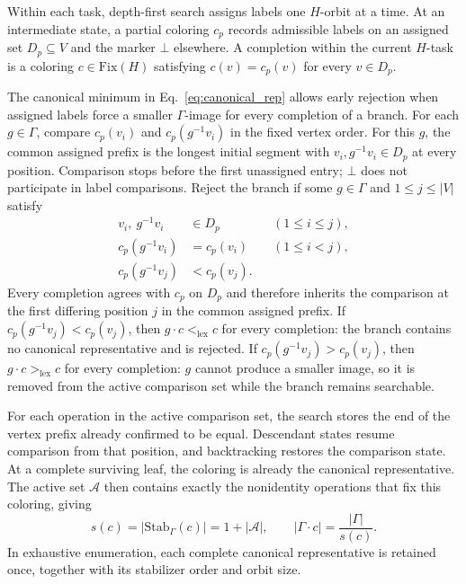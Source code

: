 \documentclass[a5paper, 10pt]{article}
\begin{document}
Within each task, depth-first search assigns labels one $H$-orbit at a time. At an intermediate state, a partial coloring $c_p$ records admissible labels on an assigned set $D_p\subseteq V$ and the marker $\bot$ elsewhere. A completion within the current $H$-task is a coloring $c\in\mathrm{Fix}(H)$ satisfying $c(v)=c_p(v)$ for every $v\in D_p$.

The canonical minimum in Eq.~\ref{eq:canonical_rep} allows early rejection when assigned labels force a smaller $\Gamma$-image for every completion of a branch.
For each $g\in\Gamma$, compare $c_p(v_i)$ and $c_p(g^{-1}v_i)$ in the fixed vertex order. For this $g$, the common assigned prefix is the longest initial segment with $v_i,g^{-1}v_i\in D_p$ at every position. Comparison stops before the first unassigned entry; $\bot$ does not participate in label comparisons. Reject the branch if some $g\in\Gamma$ and $1\leq j\leq |V|$ satisfy%
\begin{equation}
\begin{aligned}
v_i,\ g^{-1}v_i&\in D_p &&(1\leq i\leq j),\\
c_p(g^{-1}v_i)&=c_p(v_i) &&(1\leq i<j),\\
c_p(g^{-1}v_j)&<c_p(v_j).
\end{aligned}
\label{eq:prefix_rejection}
\end{equation}
Every completion agrees with $c_p$ on $D_p$ and therefore inherits the comparison at the first differing position $j$ in the common assigned prefix. If $c_p(g^{-1}v_j)<c_p(v_j)$, then $g\cdot c<_{\mathrm{lex}}c$ for every completion: the branch contains no canonical representative and is rejected. If $c_p(g^{-1}v_j)>c_p(v_j)$, then $g\cdot c>_{\mathrm{lex}}c$ for every completion: $g$ cannot produce a smaller image, so it is removed from the active comparison set while the branch remains searchable.

For each operation in the active comparison set, the search stores the end of the vertex prefix already confirmed to be equal. Descendant states resume comparison from that position, and backtracking restores the comparison state. At a complete surviving leaf, the coloring is already the canonical representative. The active set $\mathcal{A}$ then contains exactly the nonidentity operations that fix this coloring, giving
\begin{equation}
 s(c)=|\mathrm{Stab}_{\Gamma}(c)|=1+|\mathcal{A}|,
 \qquad |\Gamma\cdot c|=\frac{|\Gamma|}{s(c)}.
\label{eq:active_stabilizer}
\end{equation}
In exhaustive enumeration, each complete canonical representative is retained once, together with its stabilizer order and orbit size.
\end{document}
